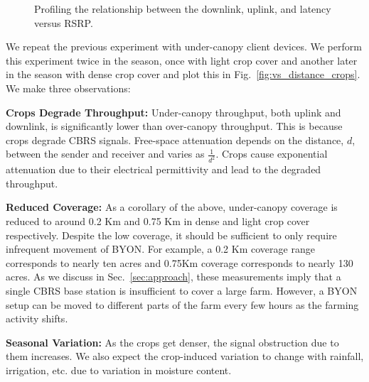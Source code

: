 \begin{figure*}[!t] %
    \centering
    \hfill
    \hfill

\vspace{-0.15in}
\caption{Profiling the relationship between the downlink, uplink, and latency versus RSRP.}
\label{fig:vs_signal}
\vspace{-0.15in}
\end{figure*}

 We repeat the previous experiment with under-canopy client devices. We perform this experiment twice in the season, once with light crop cover and another later in the season with dense crop cover and plot this in Fig.~\ref{fig:vs_distance_crops}. We make three observations:
\squishlist
\item\textbf{Crops Degrade Throughput: } Under-canopy throughput, both uplink and downlink, is significantly lower than over-canopy throughput. This is because crops degrade CBRS signals. Free-space attenuation depends on the distance, $d$, between the sender and receiver and varies as $\frac{1}{d^2}$. Crops cause exponential attenuation due to their electrical permittivity and lead to the degraded throughput.

\item\textbf{Reduced Coverage: }As a corollary of the above, under-canopy coverage is reduced to around 0.2 Km and 0.75 Km in dense and light crop cover respectively. Despite the low coverage, it should be sufficient to only require infrequent movement of BYON. For example, a 0.2 Km coverage range corresponds to nearly ten acres and 0.75Km coverage corresponds to  nearly 130 acres. As we discuss in Sec.~\ref{sec:approach}, these measurements imply that a single CBRS base station is insufficient to cover a large farm. However, a BYON setup can be moved to different parts of the farm every few hours as the farming activity shifts.

\item\textbf{Seasonal Variation: }As the crops get denser, the signal obstruction due to them increases. We also expect the crop-induced variation to change with rainfall, irrigation, etc. due to variation in moisture content. 
\squishend

